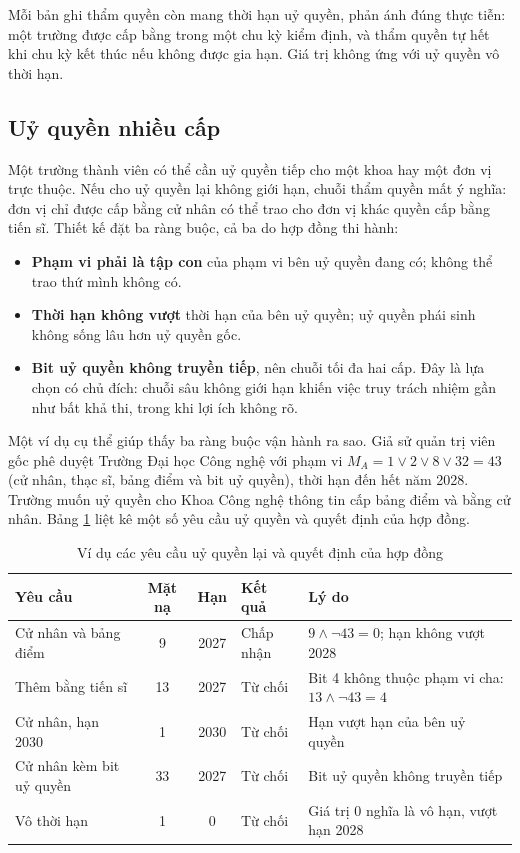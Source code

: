 

Mỗi bản ghi thẩm quyền còn mang thời hạn uỷ quyền, phản ánh đúng thực tiễn: một trường được cấp bằng trong một chu kỳ kiểm định, và thẩm quyền tự hết khi chu kỳ kết thúc nếu không được gia hạn. Giá trị không ứng với uỷ quyền vô thời hạn.

\subsection{Uỷ quyền nhiều cấp}
\label{sec:uy-quyen}

Một trường thành viên có thể cần uỷ quyền tiếp cho một khoa hay một đơn vị trực thuộc. Nếu cho uỷ quyền lại không giới hạn, chuỗi thẩm quyền mất ý nghĩa: đơn vị chỉ được cấp bằng cử nhân có thể trao cho đơn vị khác quyền cấp bằng tiến sĩ. Thiết kế đặt ba ràng buộc, cả ba do hợp đồng thi hành:

\begin{itemize}
    \item \textbf{Phạm vi phải là tập con} của phạm vi bên uỷ quyền đang có; không thể trao thứ mình không có.
    \item \textbf{Thời hạn không vượt} thời hạn của bên uỷ quyền; uỷ quyền phái sinh không sống lâu hơn uỷ quyền gốc.
    \item \textbf{Bit uỷ quyền không truyền tiếp}, nên chuỗi tối đa hai cấp. Đây là lựa chọn có chủ đích: chuỗi sâu không giới hạn khiến việc truy trách nhiệm gần như bất khả thi, trong khi lợi ích không rõ.
\end{itemize}

Một ví dụ cụ thể giúp thấy ba ràng buộc vận hành ra sao. Giả sử quản trị viên gốc phê duyệt Trường Đại học Công nghệ với phạm vi $M_A = 1 \vee 2 \vee 8 \vee 32 = 43$ (cử nhân, thạc sĩ, bảng điểm và bit uỷ quyền), thời hạn đến hết năm 2028. Trường muốn uỷ quyền cho Khoa Công nghệ thông tin cấp bảng điểm và bằng cử nhân. Bảng \ref{tab:v2-delegation} liệt kê một số yêu cầu uỷ quyền và quyết định của hợp đồng.

\begin{table}[H]
\centering
\caption{Ví dụ các yêu cầu uỷ quyền lại và quyết định của hợp đồng}
\label{tab:v2-delegation}
\renewcommand{\arraystretch}{1.2}
\small
\begin{tabular}{|p{3.4cm}|c|c|p{2.0cm}|p{4.6cm}|}
\hline
\textbf{Yêu cầu} & \textbf{Mặt nạ} & \textbf{Hạn} & \textbf{Kết quả} & \textbf{Lý do} \\ \hline
Cử nhân và bảng điểm & 9 & 2027 & Chấp nhận & $9 \wedge \neg 43 = 0$; hạn không vượt 2028 \\ \hline
Thêm bằng tiến sĩ & 13 & 2027 & Từ chối & Bit 4 không thuộc phạm vi cha: $13 \wedge \neg 43 = 4$ \\ \hline
Cử nhân, hạn 2030 & 1 & 2030 & Từ chối & Hạn vượt hạn của bên uỷ quyền \\ \hline
Cử nhân kèm bit uỷ quyền & 33 & 2027 & Từ chối & Bit uỷ quyền không truyền tiếp \\ \hline
Vô thời hạn & 1 & 0 & Từ chối & Giá trị 0 nghĩa là vô hạn, vượt hạn 2028 \\ \hline
\end{tabular}
\end{table}

